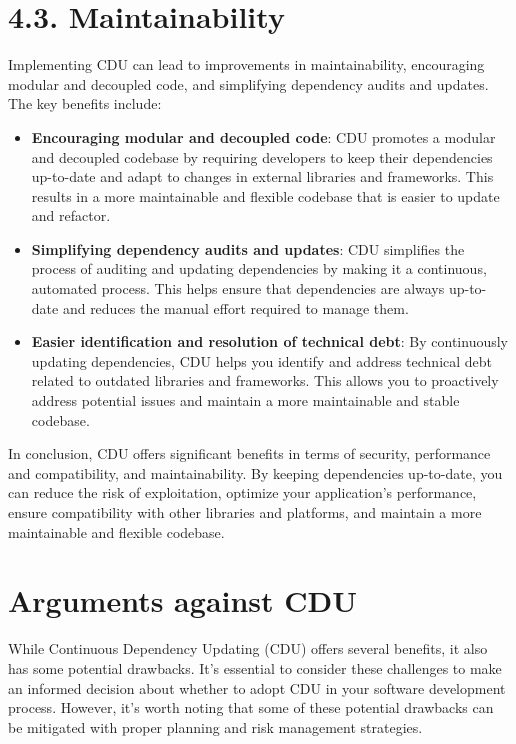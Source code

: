 \documentclass[10pt]{article}
\begin{document}
\section*{4.3. Maintainability}

Implementing CDU can lead to improvements in maintainability, encouraging modular and decoupled code, and simplifying dependency audits and updates. The key benefits include:

\begin{itemize}

  \item \textbf{Encouraging modular and decoupled code}: CDU promotes a modular and decoupled codebase by requiring developers to keep their dependencies up-to-date and adapt to changes in external libraries and frameworks. This results in a more maintainable and flexible codebase that is easier to update and refactor.

  \item \textbf{Simplifying dependency audits and updates}: CDU simplifies the process of auditing and updating dependencies by making it a continuous, automated process. This helps ensure that dependencies are always up-to-date and reduces the manual effort required to manage them.

  \item \textbf{Easier identification and resolution of technical debt}: By continuously updating dependencies, CDU helps you identify and address technical debt related to outdated libraries and frameworks. This allows you to proactively address potential issues and maintain a more maintainable and stable codebase.

\end{itemize}

In conclusion, CDU offers significant benefits in terms of security, performance and compatibility, and maintainability. By keeping dependencies up-to-date, you can reduce the risk of exploitation, optimize your application's performance, ensure compatibility with other libraries and platforms, and maintain a more maintainable and flexible codebase.

\section*{Arguments against CDU}

While Continuous Dependency Updating (CDU) offers several benefits, it also has some potential drawbacks. It's essential to consider these challenges to make an informed decision about whether to adopt CDU in your software development process. However, it's worth noting that some of these potential drawbacks can be mitigated with proper planning and risk management strategies.
\end{document}
